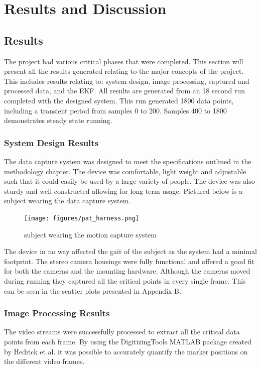 \chapter{Results and Discussion}

\section{Results}
The project had various critical phases that were completed. This section will present all the results generated relating to the major concepts of the project. This includes results relating to: system design, image processing, captured and processed data, and the EKF. All results are generated from an 18 second run completed with the designed system. This run generated 1800 data points, including a transient period from samples 0 to 200. Samples 400 to 1800 demonstrates steady state running.

\subsection{System Design Results}
The data capture system was designed to meet the specifications outlined in the methodology chapter. The device was comfortable, light weight and adjustable such that it could easily be used by a large variety of people. The device was also sturdy and well constructed allowing for long term usage. Pictured below is a subject wearing the data capture system.

\begin{figure}[!ht] 
\captionsetup{width=0.8\linewidth, font=small}  
\texttt{[image: figures/pat\_harness.png]}
\caption{subject wearing the motion capture system }
\label{fig:pat_harness}
\end{figure}

The device in no way affected the gait of the subject as the system had a minimal footprint. The stereo camera housings were fully functional and offered a good fit for both the cameras and the mounting hardware. Although the cameras moved during running they captured all the critical points in every single frame. This can be seen in the scatter plots presented in Appendix B.

\subsection{Image Processing Results}
The video streams were successfully processed to extract all the critical data points from each frame. By using the DigitizingTools MATLAB package created by Hedrick et al. \cite{hedrick2008software} it was possible to accurately quantify the marker positions on the different video frames. 

